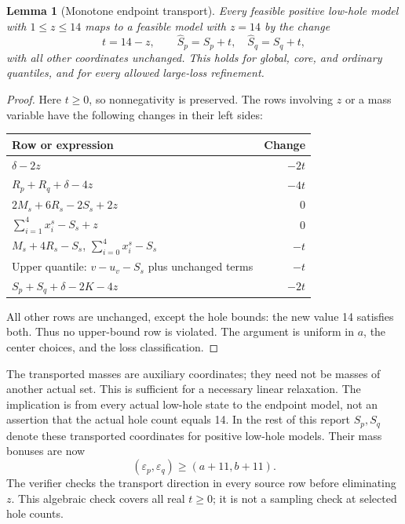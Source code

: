 \documentclass[11pt,a4paper]{article}
\newtheorem{lemma}[theorem]{Lemma}
\begin{document}
\begin{lemma}[Monotone endpoint transport]\label{lem:transport}
Every feasible positive low-hole model with $1\le z\le14$ maps to a
feasible model with $z=14$ by the change
\[
 t=14-z,\qquad \widehat S_p=S_p+t,\quad
 \widehat S_q=S_q+t,
\]
with all other coordinates unchanged. This holds for global, core,
and ordinary quantiles, and for every allowed large-loss refinement.
\end{lemma}
\begin{proof}
Here $t\ge0$, so nonnegativity is preserved. The rows involving $z$
or a mass variable have the following changes in their left sides:
\begin{center}
\begin{tabular}{lr}
\toprule
Row or expression&Change\\
\midrule
$\delta-2z$&$-2t$\\
$R_p+R_q+\delta-4z$&$-4t$\\
$2M_s+6R_s-2S_s+2z$&$0$\\
$\sum_{i=1}^4x_i^s-S_s+z$&$0$\\
$M_s+4R_s-S_s$, $\sum_{i=0}^4x_i^s-S_s$&$-t$\\
Upper quantile: $v-u_v-S_s$ plus unchanged terms&$-t$\\
$S_p+S_q+\delta-2K-4z$&$-2t$\\
\bottomrule
\end{tabular}
\end{center}
All other rows are unchanged, except the hole bounds: the new value
14 satisfies both. Thus no upper-bound row is violated. The argument
is uniform in $a$, the center choices, and the loss classification.
\end{proof}
The transported masses are auxiliary coordinates; they need not be
masses of another actual set. This is sufficient for a necessary linear
relaxation. The implication is from every actual low-hole state to the
endpoint model, not an assertion that the actual hole count equals 14.
In the rest of this report $S_p,S_q$ denote these transported coordinates
for positive low-hole models. Their mass bonuses are now
\begin{equation}\label{eq:bonuses}
 (\varepsilon_p,\varepsilon_q)\ge(a+11,b+11).
\end{equation}
The verifier checks the transport direction in every source row before
eliminating $z$. This algebraic check covers all real $t\ge0$; it is not
a sampling check at selected hole counts.
\end{document}
